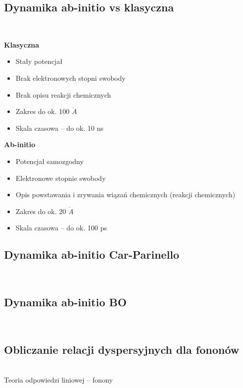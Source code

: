 \subsection{Dynamika ab-initio vs klasyczna}
~\\
\begin{multicols}{2}
\textbf{Klasyczna}
\begin{itemize}
\item Stały potencjał
\item Brak elektronowych stopni swobody
\item Brak opisu reakcji chemicznych
\item Zakres do ok. 100 $\mathring{A}$
\item Skala czasowa – do ok. 10 ns
\end{itemize}
\textbf{Ab-initio}
\begin{itemize}
\item Potencjał samozgodny
\item Elektronowe stopnie swobody
\item Opis powstawania i zrywania wiązań chemicznych (reakcji chemicznych)
\item Zakres do ok. 20 $\mathring{A}$
\item Skala czasowa – do ok. 100 ps
\end{itemize}
\end{multicols}

\subsection{Dynamika ab-initio Car-Parinello}
~\\

\subsection{Dynamika ab-initio BO}
~\\

\subsection{Obliczanie relacji dyspersyjnych dla fononów}
~\\
Teoria odpowiedzi liniowej – fonony
